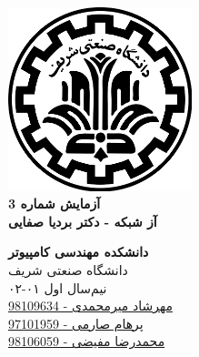 \documentclass{article}
\begin{document}
\begin{titlepage}
	\begin{center}
		\vspace{0.2cm}
		
		\includegraphics[width=0.4\textwidth]{sharif.png}\\
		\vspace{0.2cm}
		\textbf{ \Huge{آزمایش شماره 3}}\\
		\vspace{0.25cm}
		\textbf{ \Large{آز شبکه - دکتر بردیا صفایی}}
		\vspace{0.2cm}
		
		
		\large \textbf{دانشکده مهندسی کامپیوتر}\\\vspace{0.1cm}
		\large   دانشگاه صنعتی شریف\\\vspace{0.2cm}
		\large   ﻧﯿﻢ‌سال اول ۰۱-۰۲ \\\vspace{0.10cm}
		\large{\href{mailto:mehrshad.mirmohammadi@gmail.com}{مهرشاد میرمحمدی - 98109634}}\\
		\large{\href{mailto:parhaamsaremi@gmail.com}{پرهام صارمی - 97101959}}\\
		\large{\href{mailto:mofayezi.m@gmail.com}{محمدرضا مفیضی - 98106059}}\\
	\end{center}
\end{titlepage}

\newpage

\pagestyle{fancy}
\fancyhf{}
\fancyfoot{}
\setlength{\headheight}{59pt}
\cfoot{\thepage}
\end{document}
